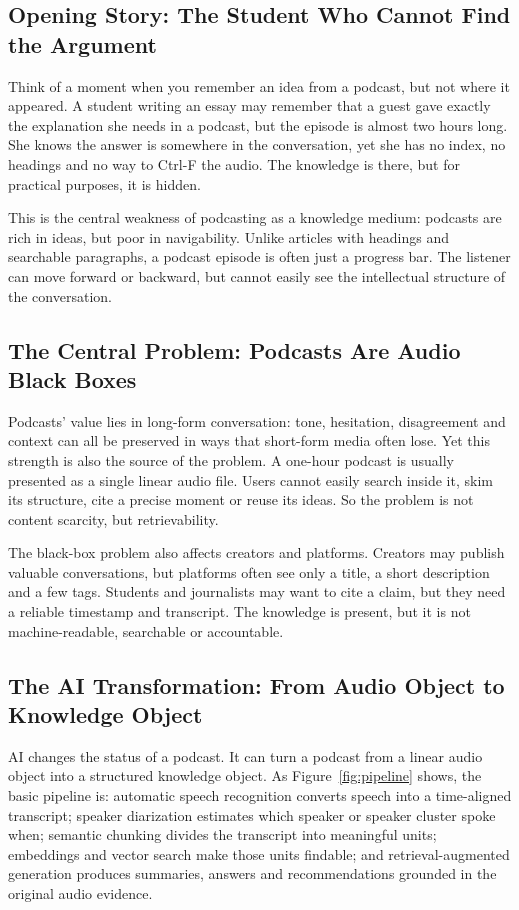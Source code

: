 \documentclass[11pt,a4paper]{article}
\begin{document}
\subsection{Opening Story: The Student Who Cannot Find the Argument}

Think of a moment when you remember an idea from a podcast, but not where it appeared. A student writing an essay may remember that a guest gave exactly the explanation she needs in a podcast, but the episode is almost two hours long. She knows the answer is somewhere in the conversation, yet she has no index, no headings and no way to Ctrl-F the audio. The knowledge is there, but for practical purposes, it is hidden.

This is the central weakness of podcasting as a knowledge medium: podcasts are rich in ideas, but poor in navigability. Unlike articles with headings and searchable paragraphs, a podcast episode is often just a progress bar. The listener can move forward or backward, but cannot easily see the intellectual structure of the conversation.



\subsection{The Central Problem: Podcasts Are Audio Black Boxes}

Podcasts' value lies in long-form conversation: tone, hesitation, disagreement and context can all be preserved in ways that short-form media often lose. Yet this strength is also the source of the problem. A one-hour podcast is usually presented as a single linear audio file. Users cannot easily search inside it, skim its structure, cite a precise moment or reuse its ideas. So the problem is not content scarcity, but retrievability.

The black-box problem also affects creators and platforms. Creators may publish valuable conversations, but platforms often see only a title, a short description and a few tags. Students and journalists may want to cite a claim, but they need a reliable timestamp and transcript. The knowledge is present, but it is not machine-readable, searchable or accountable.

\subsection{The AI Transformation: From Audio Object to Knowledge Object}

AI changes the status of a podcast. It can turn a podcast from a linear audio object into a structured knowledge object. As Figure~\ref{fig:pipeline} shows, the basic pipeline is: automatic speech recognition converts speech into a time-aligned transcript; speaker diarization estimates which speaker or speaker cluster spoke when; semantic chunking divides the transcript into meaningful units; embeddings and vector search make those units findable; and retrieval-augmented generation produces summaries, answers and recommendations grounded in the original audio evidence.
\end{document}
